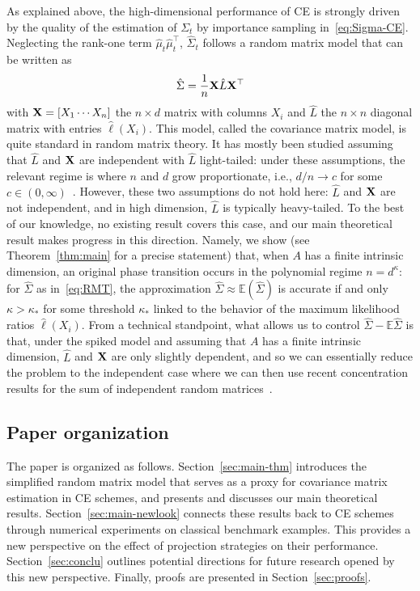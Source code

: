\documentclass[]{article}
\newcommand{\E}{\mathbb{E}}
\newcommand{\npar}{{n}}
\theoremstyle{plain}
\theoremstyle{definition}
\begin{document}
As explained above, the high-dimensional performance of CE is strongly driven by the quality of the estimation of $\Sigma_t$ by importance sampling in~\eqref{eq:Sigma-CE}. Neglecting the rank-one term $\hat \mu_t \hat \mu_t^\top$, $\hat \Sigma_t$ follows a random matrix model that can be written as
\begin{equation} \label{eq:RMT}
	\hat \Sigma = \frac{1}{n} {\bf X} \hat L {\bf X}^\top
\end{equation}
with ${\bf X} = [X_1 \cdots X_\npar]$ the $\npar \times d$ matrix with columns $X_i$ and $\hat L$ the $n \times n$ diagonal matrix with entries $\hat \ell(X_i)$. This model, called the covariance matrix model, is quite standard in random matrix theory. It has mostly been studied assuming that $\hat L$ and $\bf X$ are independent with $\hat L$ light-tailed: under these assumptions, the relevant regime is where $n$ and $d$ grow proportionate, i.e., $d/n \to c$ for some $c \in (0,\infty)$~\cite{BAIK20061382, benaych-georges_eigenvalues_2011, capitaine2016spectrumdeformedrandommatrices, Paul_07}. However, these two assumptions do not hold here: $\hat L$ and $\bf X$ are not independent, and in high dimension, $\hat L$ is typically heavy-tailed. To the best of our knowledge, no existing result covers this case, and our main theoretical result makes progress in this direction. Namely, we show (see Theorem~\ref{thm:main} for a precise statement) that, when $A$ has a finite intrinsic dimension, an original phase transition occurs in the polynomial regime $n = d^\kappa$: for $\hat \Sigma$ as in~\eqref{eq:RMT}, the approximation $\hat \Sigma \approx \E(\hat \Sigma)$ is accurate if and only $\kappa > \kappa_*$ for some threshold $\kappa_*$ linked to the behavior of the maximum likelihood ratios $\hat \ell(X_i)$. From a technical standpoint, what allows us to control $\hat \Sigma - \E \hat \Sigma$ is that, under the spiked model and assuming that $A$ has a finite intrinsic dimension, $\hat L$ and $\bf X$ are only slightly dependent, and so we can essentially reduce the problem to the independent case where we can then use recent concentration results for the sum of independent random matrices~\cite{Brailovskaya24-0}.



\subsection{Paper organization}


The paper is organized as follows. Section~\ref{sec:main-thm} introduces the simplified random matrix model that serves as a proxy for covariance matrix estimation in CE schemes, and presents and discusses our main theoretical results. Section~\ref{sec:main-newlook} connects these results back to CE schemes through numerical experiments on classical benchmark examples. This provides a new perspective on the effect of projection strategies on their performance. Section~\ref{sec:conclu} outlines potential directions for future research opened by this new perspective. Finally, proofs are presented in Section~\ref{sec:proofs}.
\end{document}
